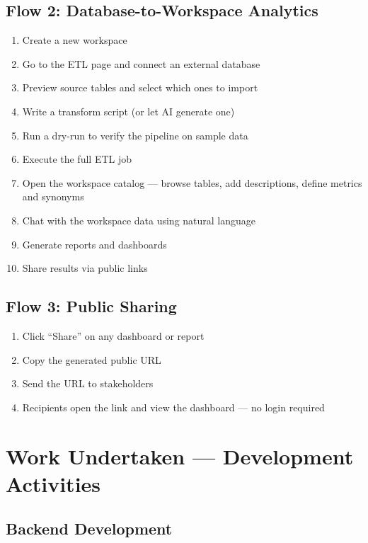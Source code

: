 \documentclass[12pt,a4paper]{report}
\begin{document}
\subsection{Flow 2: Database-to-Workspace Analytics}

\begin{enumerate}[leftmargin=1.5cm]
    \item Create a new workspace
    \item Go to the ETL page and connect an external database
    \item Preview source tables and select which ones to import
    \item Write a transform script (or let AI generate one)
    \item Run a dry-run to verify the pipeline on sample data
    \item Execute the full ETL job
    \item Open the workspace catalog --- browse tables, add descriptions, define metrics and synonyms
    \item Chat with the workspace data using natural language
    \item Generate reports and dashboards
    \item Share results via public links
\end{enumerate}

\subsection{Flow 3: Public Sharing}

\begin{enumerate}[leftmargin=1.5cm]
    \item Click ``Share'' on any dashboard or report
    \item Copy the generated public URL
    \item Send the URL to stakeholders
    \item Recipients open the link and view the dashboard --- no login required
\end{enumerate}

\section{Work Undertaken --- Development Activities}

\subsection{Backend Development}
\end{document}
